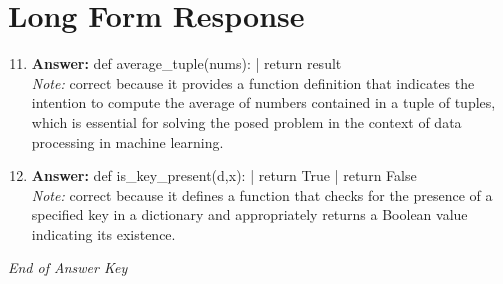 \documentclass[12pt]{article}
\begin{document}
\section*{Long Form Response}
\begin{enumerate}[label=\arabic*.]
\setcounter{enumi}{10}
\item \textbf{Answer:} def average\_tuple(nums): | return result
\\ \textit{Note:} correct because it provides a function definition that indicates the intention to compute the average of numbers contained in a tuple of tuples, which is essential for solving the posed problem in the context of data processing in machine learning.
\item \textbf{Answer:} def is\_key\_present(d,x): | return True | return False
\\ \textit{Note:} correct because it defines a function that checks for the presence of a specified key in a dictionary and appropriately returns a Boolean value indicating its existence.
\end{enumerate}

\vfill
\noindent\textit{End of Answer Key}
\end{document}
